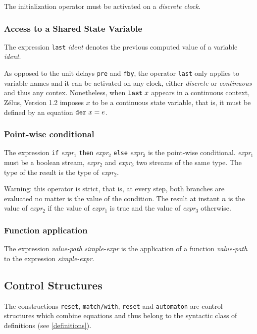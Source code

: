 \documentclass[11pt,titlepage,twoside]{report}
\newcommand{\zelus}{{\sf Z\'elus}}
\newcommand{\If}{\mbox{{\tt if}}}
\newcommand{\Then}{\mbox{{\tt then}}}
\newcommand{\Else}{\mbox{{\tt else}}}
\newcommand{\Pre}{\mbox{{\tt pre}}}
\newcommand{\Last}{\mbox{{\tt last}}}
\newcommand{\Fby}{\mbox{{\tt fby}}}
\newcommand{\term}[1]{{\tt #1}}
\newcommand{\nterm}[1]{{\em #1}}
\begin{document}
The initialization operator must be activated on a \emph{discrete clock}.

\subsubsection{Access to a Shared State Variable}
The expression \term{\Last} \nterm{ident} denotes the previous computed value
of a variable \nterm{ident}.

As opposed to the unit delays \term{\Pre} and \term{\Fby}, the
operator \term{\Last} only applies to variable names and it can be activated
on any clock, either \emph{discrete} or \emph{continuous} and thus
any contex. Nonetheless, when $\term{\Last}\; x$ appears in a continuous context,
\zelus, Version 1.2 imposes $x$ to be a continuous state variable, that is,
it must be defined by an equation $\term{der}\; x = e$.

\subsubsection{Point-wise conditional}
The expression \term{\If} \nterm{expr}$_1$ \term{\Then}
\nterm{expr}$_2$ \term{\Else} \nterm{expr}$_3$ is the point-wise
conditional. \nterm{expr}$_1$ must be a boolean stream,
\nterm{expr}$_2$ and \nterm{expr}$_3$ two streams of the same
type. The type of the result is the type of \nterm{expr}$_2$.

Warning: this operator is strict, that is, at every step, both branches
are evaluated no matter is the value of the condition. The result at instant
$n$ is the value of \nterm{expr}$_2$ if the value of \nterm{expr}$_1$ is true and
the value of \nterm{expr}$_3$ otherwise.

\subsubsection{Function application}
The expression \nterm{value-path} \nterm{simple-expr} is the application
of a function \nterm{value-path} to the expression \nterm{simple-expr}.

\subsection{Control Structures}
The constructions \verb-reset-, \verb-match/with-, \verb-reset- and
\verb-automaton- are control-structures which combine equations and
thus belong to the syntactic class of definitions (see
\cref{definitions}).
\end{document}
